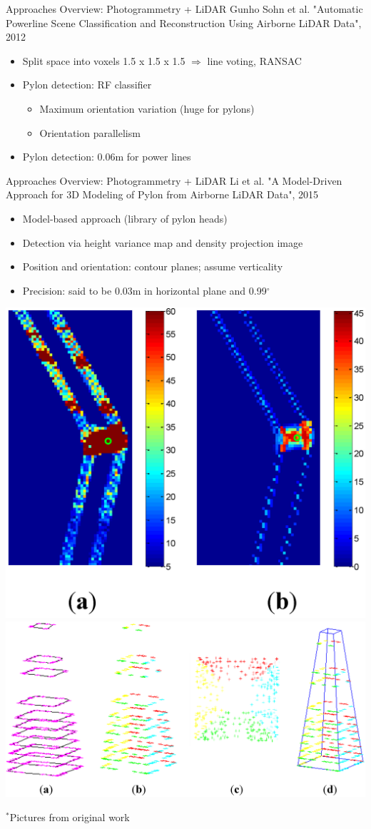 \documentclass{beamer}
\begin{document}
\begin{frame}[t, fragile]{Approaches Overview: Photogrammetry + LiDAR}
Gunho Sohn et al. "Automatic Powerline Scene Classification and Reconstruction Using Airborne LiDAR Data", 2012 
\begin{itemize}
\item Split space into voxels 1.5 x 1.5 x 1.5 $\Rightarrow$ line voting, RANSAC
\item Pylon detection: RF classifier
\begin{itemize}
\item Maximum orientation variation (huge for pylons)
\item Orientation parallelism
\end{itemize}
\item Pylon detection: 0.06m for power lines
\end{itemize}
\end{frame}

\begin{frame}[t, fragile]{Approaches Overview: Photogrammetry + LiDAR}
Li et al. "A Model-Driven Approach for 3D Modeling of Pylon from Airborne LiDAR Data", 2015
\begin{itemize}
\item Model-based approach (library of pylon heads)
\item Detection via height variance map and density projection image
\item Position and orientation: contour planes; assume verticality
\item Precision: said to be 0.03m in horizontal plane and 0.99$^\circ $
\end{itemize}
\begin{center}
\includegraphics[width=0.3\linewidth]{model_based_lidar1}
\includegraphics[width=0.5\linewidth]{model_based_lidar3}
\end{center}

\begin{flushright}
\small{$^*$Pictures from original work}
\end{flushright}
\end{frame}
\end{document}
